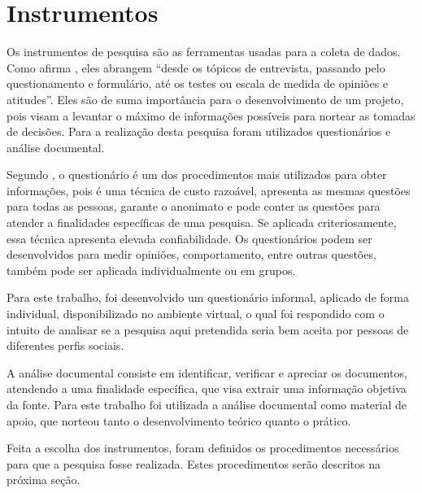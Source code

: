 \section{Instrumentos}

\par Os instrumentos de pesquisa são as ferramentas usadas para a coleta de dados. Como afirma , eles abrangem “desde os tópicos de entrevista, passando pelo questionamento e formulário, até os testes ou escala de medida de opiniões e atitudes”. Eles são de suma importância para o desenvolvimento de um projeto, pois visam a levantar o máximo de informações possíveis para nortear as tomadas de decisões. Para a realização desta pesquisa foram utilizados questionários e análise documental.

\par Segundo , o questionário é um dos procedimentos mais utilizados para obter informações, pois é uma técnica de custo razoável, apresenta as mesmas questões para todas as pessoas, garante o anonimato e pode conter as questões para atender a finalidades específicas de uma pesquisa. Se aplicada criteriosamente, essa técnica apresenta elevada confiabilidade. Os questionários podem ser desenvolvidos para medir opiniões, comportamento, entre outras questões, também pode ser aplicada individualmente ou em grupos.

\par Para este trabalho, foi desenvolvido um questionário informal, aplicado de forma individual, disponibilizado no ambiente virtual, o qual foi respondido com o intuito de analisar se a pesquisa aqui pretendida seria bem aceita por pessoas de diferentes perfis sociais. %


\par A análise documental consiste em identificar, verificar e apreciar os documentos, atendendo a uma finalidade específica, que visa extrair uma informação objetiva da fonte. Para este trabalho foi utilizada a análise documental como material de apoio, que norteou tanto o desenvolvimento teórico quanto o prático.

\par Feita a escolha dos instrumentos, foram definidos os procedimentos necessários para que a pesquisa fosse realizada. Estes procedimentos serão descritos na próxima seção.


